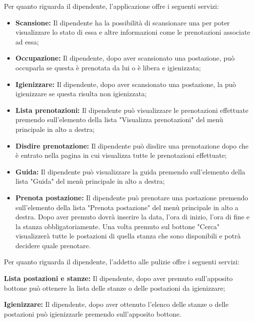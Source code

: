 Per quanto riguarda il dipendente, l'applicazione offre i seguenti servizi:
\begin{itemize}
	\item \textbf{Scansione:} Il dipendente ha la possibilità di scansionare una  per poter visualizzare lo stato di essa e altre informazioni come le prenotazioni associate ad essa; \\
	\item \textbf{Occupazione:} Il dipendente, dopo aver scansionato una postazione, può occuparla se questa è prenotata da lui o è libera e igienizzata; \\
	\item \textbf{Igienizzare:} Il dipendente, dopo aver scansionato una postazione, la può igienizzare se questa risulta non igienizzata; \\
	\item \textbf{Lista prenotazioni:} Il dipendente può visualizzare le prenotazioni effettuate premendo sull'elemento della lista "Visualizza prenotazioni" del menù principale in alto a destra; \\
	\item \textbf{Disdire prenotazione:} Il dipendente può disdire una prenotazione dopo che è entrato nella pagina in cui visualizza tutte le prenotazioni effettuate; \\
	\item \textbf{Guida:} Il dipendente può visualizzare la guida premendo sull'elemento della lista "Guida" del menù principale in alto a destra; \\
	\item \textbf{Prenota postazione:} Il dipendente può prenotare una postazione premendo sull'elemento della lista "Prenota postazione" del menù principale in alto a destra.
	Dopo aver premuto dovrà inserire la data, l'ora di inizio, l'ora di fine e la stanza obbligatoriamente.
	Una volta premuto sul bottone "Cerca" visualizzerà tutte le postazioni di quella stanza che sono disponibili e potrà decidere quale prenotare. \\	
\end{itemize}
Per quanto riguarda il dipendente, l'addetto alle pulizie offre i seguenti servizi:
\item \textbf{Lista postazioni e stanze:} Il dipendente, dopo aver premuto sull'apposito bottone può ottenere la lista delle stanze o delle postazioni da igienizzare;
\item \textbf{Igienizzare:} Il dipendente, dopo aver ottenuto l'elenco delle stanze o delle postazioni può igienizzarle premendo sull'apposito bottone.




